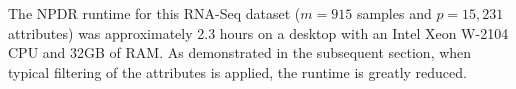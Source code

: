 \documentclass[10pt]{article}
\begin{document}
The NPDR runtime for this RNA-Seq dataset ($m=915$ samples and $p=15,231$ attributes) was approximately 2.3 hours on a desktop with an Intel Xeon W-2104 CPU and 32GB of RAM.
As demonstrated in the subsequent section, when typical filtering of the attributes is applied, the runtime is greatly reduced.


% 
\end{document}
